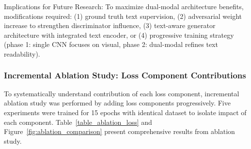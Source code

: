 \documentclass[journal]{IEEEtran}
\begin{document}
Implications for Future Research: To maximize dual-modal architecture benefits, modifications required: (1) ground truth text supervision, (2) adversarial weight increase to strengthen discriminator influence, (3) text-aware generator architecture with integrated text encoder, or (4) progressive training strategy (phase 1: single CNN focuses on visual, phase 2: dual-modal refines text readability).

\subsubsection{Incremental Ablation Study: Loss Component Contributions}

To systematically understand contribution of each loss component, incremental ablation study was performed by adding loss components progressively. Five experiments were trained for 15 epochs with identical dataset to isolate impact of each component. Table~\ref{table_ablation_loss} and Figure~\ref{fig:ablation_comparison} present comprehensive results from ablation study.
\end{document}
